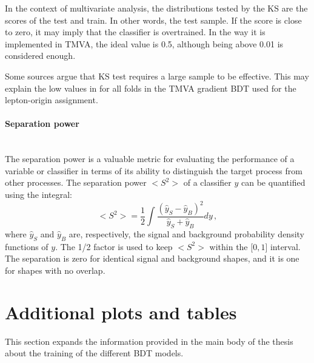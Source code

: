 In the context of multivariate analysis, 
the distributions tested by the KS are the scores of the test and train. In other words, 
the test sample. If the score is close to zero, it may imply that the classifier is overtrained.
In the way it is implemented in TMVA, the ideal value is 0.5, although being above 0.01 is
considered enough.


Some sources argue that KS test requires a large sample to be effective.
This  may explain the low values in for all folds in the TMVA gradient
BDT used for the lepton-origin assignment.

 
\paragraph{Separation power}\mbox{}\\
The separation power is a valuable metric for evaluating the performance 
of a variable or classifier in terms of its ability to distinguish the target process 
from other processes. The separation power $<S^{2}>$ of a classifier $y$ can 
be quantified using the integral:
\begin{equation}\label{eq:Appendix:BDT:SeparationPower}
	<S^{2}> = \frac{1}{2}\int \frac{(\hat{y}_{S} - \hat{y}_{B})^{2}}{\hat{y}_{S}+\hat{y}_{B}}dy \, ,
\end{equation}
where $\hat{y}_{S}$ and $\hat{y}_{B}$ are, respectively, the signal and background probability 
density functions of $y$.  The 1/2 factor is used to keep $<S^{2}>$ within the [$0, 1$] interval.
The separation is zero for identical signal and background shapes, and 
it is one for shapes with no overlap.





\section{Additional plots and tables}
\label{sec:BDT:AdditionalMaterial}
This section expands the information provided in the main body of the thesis 
about the training of the different BDT models. 

